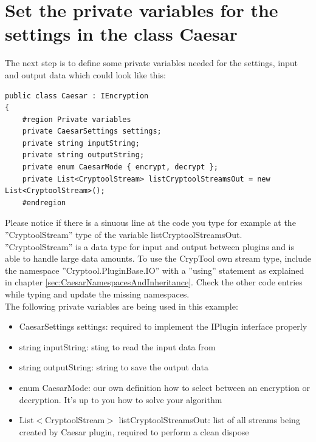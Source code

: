 \section{Set the private variables for the settings in the class Caesar}\label{sec:SetThePrivateVariablesForTheSettingsInTheClassCaesar}
The next step is to define some private variables needed for the settings, input and output data which could look like this:
\begin{lstlisting}
public class Caesar : IEncryption
{
	#region Private variables
	private CaesarSettings settings;
	private string inputString;
	private string outputString;
	private enum CaesarMode { encrypt, decrypt };
	private List<CryptoolStream> listCryptoolStreamsOut = new List<CryptoolStream>();
	#endregion
\end{lstlisting}
Please notice if there is a sinuous line at the code you type for example at the ''CryptoolStream'' type of the variable listCryptoolStreamsOut. ''CryptoolStream'' is a data type for input and output between plugins and is able to handle large data amounts. To use the CrypTool own stream type, include the namespace ''Cryptool.PluginBase.IO'' with a ''using'' statement as explained in chapter \ref{sec:CaesarNamespacesAndInheritance}. Check the other code entries while typing and update the missing namespaces.\\
The following private variables are being used in this example:
\begin{itemize}
	\item CaesarSettings settings: required to implement the IPlugin interface properly
	\item string inputString: sting to read the input data from
	\item string outputString: string to save the output data
	\item enum CaesarMode: our own definition how to select between an encryption or decryption. It's up to you how to solve your algorithm
	\item List$<$CryptoolStream$>$ listCryptoolStreamsOut: list of all streams being created by Caesar plugin, required to perform a clean dispose
\end{itemize}
